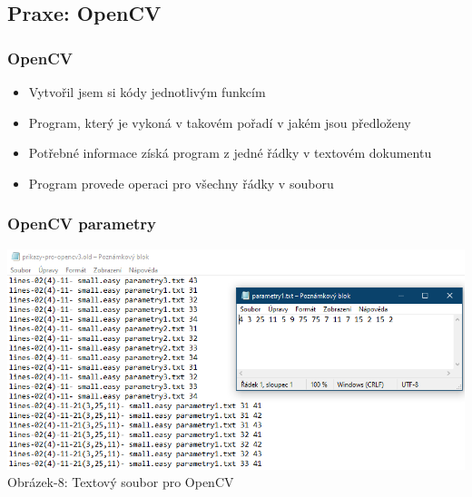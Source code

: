 \documentclass{beamer}
\begin{document}
\subsection{Praxe: OpenCV}
\begin{frame}
\frametitle{OpenCV}
\begin{itemize}
\item Vytvořil jsem si kódy jednotlivým funkcím
\item Program, který je vykoná v takovém pořadí v jakém jsou předloženy
\item Potřebné informace získá program z jedné řádky v textovém dokumentu
\item Program provede operaci pro všechny řádky v souboru
\end{itemize}
\end{frame}
\begin{frame}
\frametitle{OpenCV parametry}
\centering
		\includegraphics[width=1.1\textwidth]{img/pro-OpenCV.png}\\
     	Obrázek-8: Textový soubor pro OpenCV
\end{frame}
\end{document}
